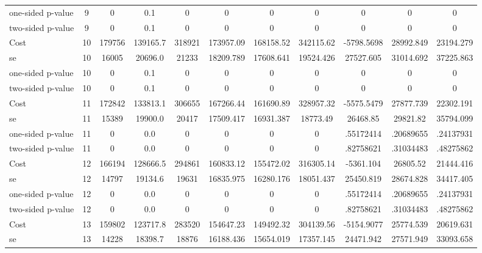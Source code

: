 \begin{tabular}{lcccccccccc}
one-sided p-value &              9 &         0 &       0.1 &         0 & 0 & 0 & 0 & 0 & 0 & 0 \\  
two-sided p-value &              9 &         0 &       0.1 &         0 & 0 & 0 & 0 & 0 & 0 & 0 \\  
Cost 			  &              10 &    179756 &  139165.7 &    318921 & 173957.09 & 168158.52 & 342115.62 & -5798.5698 & 28992.849 & 23194.279 \\  
se 				 &              10 &     16005 &   20696.0 &     21233 & 18209.789 & 17608.641 & 19524.426 & 27527.605 & 31014.692 & 37225.863 \\  
one-sided p-value&              10 &         0 &       0.1 &         0 & 0 & 0 & 0 & 0 & 0 & 0 \\  
two-sided p-value&              10 &         0 &       0.1 &         0 & 0 & 0 & 0 & 0 & 0 & 0 \\  
Cost 			  &              11 &    172842 &  133813.1 &    306655 & 167266.44 & 161690.89 & 328957.32 & -5575.5479 & 27877.739 & 22302.191 \\  
se 				 &              11 &     15389 &   19900.0 &     20417 & 17509.417 & 16931.387 & 18773.49 & 26468.85 & 29821.82 & 35794.099 \\  
one-sided p-value&              11 &         0 &       0.0 &         0 & 0 & 0 & 0 & .55172414 & .20689655 & .24137931 \\  
two-sided p-value&              11 &         0 &       0.0 &         0 & 0 & 0 & 0 & .82758621 & .31034483 & .48275862 \\  
 Cost 			  &             12 &    166194 &  128666.5 &    294861 & 160833.12 & 155472.02 & 316305.14 & -5361.104 & 26805.52 & 21444.416 \\  
 se 				 &             12 &     14797 &   19134.6 &     19631 & 16835.975 & 16280.176 & 18051.437 & 25450.819 & 28674.828 & 34417.405 \\  
 one-sided p-value&             12 &         0 &       0.0 &         0 & 0 & 0 & 0 & .55172414 & .20689655 & .24137931 \\  
 two-sided p-value&             12 &         0 &       0.0 &         0 & 0 & 0 & 0 & .82758621 & .31034483 & .48275862 \\  
 Cost 			  &             13 &    159802 &  123717.8 &    283520 & 154647.23 & 149492.32 & 304139.56 & -5154.9077 & 25774.539 & 20619.631 \\  
 se 				 &             13 &     14228 &   18398.7 &     18876 & 16188.436 & 15654.019 & 17357.145 & 24471.942 & 27571.949 & 33093.658 \\  

\end{tabular}
